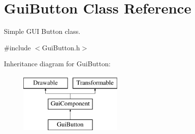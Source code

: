 \hypertarget{class_gui_button}{}\section{Gui\+Button Class Reference}
\label{class_gui_button}


Simple G\+UI Button class.  




{\ttfamily \#include $<$Gui\+Button.\+h$>$}

Inheritance diagram for Gui\+Button\+:\begin{figure}[H]
\begin{center}
\leavevmode
\includegraphics[height=3.000000cm]{class_gui_button}
\end{center}
\end{figure}
